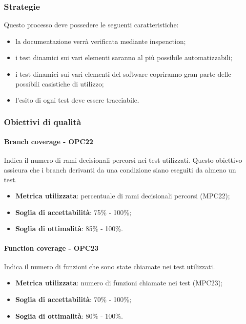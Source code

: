\documentclass[PdQ.tex]{subfiles}
\begin{document}
		\subsubsection{Strategie}
			Questo processo deve possedere le seguenti caratteristiche:
			\begin{itemize}
				\item la documentazione verrà verificata mediante inspenction;
				\item i test dinamici sui vari elementi saranno al più possibile automatizzabili;
				\item i test dinamici sui vari elementi del software copriranno gran parte delle possibili casistiche di utilizzo;
				\item l'esito di ogni test deve essere tracciabile.
			\end{itemize}
		
		\subsubsection{Obiettivi di qualità}
			\paragraph{Branch coverage - OPC22}
				Indica il numero di rami decisionali percorsi nei test utilizzati. Questo obiettivo assicura che i branch derivanti da una condizione siano
				eseguiti da almeno un test.
				\begin{itemize}
					\item \textbf{Metrica utilizzata}: percentuale di rami decisionali percorsi (MPC22);
					\item \textbf{Soglia di accettabilità}: 75\% - 100\%;
					\item \textbf{Soglia di ottimalità}: 85\% - 100\%.
				\end{itemize}
			
			\paragraph{Function coverage - OPC23}
				Indica il numero di funzioni che sono state chiamate nei test utilizzati.
				\begin{itemize}
					\item \textbf{Metrica utilizzata}: numero di funzioni chiamate nei test (MPC23);
					\item \textbf{Soglia di accettabilità}: 70\% - 100\%;
					\item \textbf{Soglia di ottimalità}: 80\% - 100\%.
				\end{itemize}
				
\end{document}
